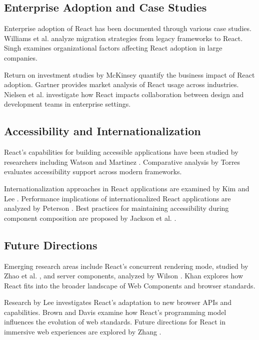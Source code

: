 \subsection{Enterprise Adoption and Case Studies}
Enterprise adoption of React has been documented through various case studies. Williams et al. \cite{williams2022} analyze migration strategies from legacy frameworks to React. Singh \cite{singh2021} examines organizational factors affecting React adoption in large companies.

Return on investment studies by McKinsey \cite{mckinsey2021} quantify the business impact of React adoption. Gartner \cite{gartner2022} provides market analysis of React usage across industries. Nielsen et al. \cite{nielsen2021} investigate how React impacts collaboration between design and development teams in enterprise settings.

\subsection{Accessibility and Internationalization}
React's capabilities for building accessible applications have been studied by researchers including Watson \cite{watson2020} and Martinez \cite{martinez2021}. Comparative analysis by Torres \cite{torres2019} evaluates accessibility support across modern frameworks.

Internationalization approaches in React applications are examined by Kim and Lee \cite{kim2022}. Performance implications of internationalized React applications are analyzed by Peterson \cite{peterson2021}. Best practices for maintaining accessibility during component composition are proposed by Jackson et al. \cite{jackson2022}.

\subsection{Future Directions}
Emerging research areas include React's concurrent rendering mode, studied by Zhao et al. \cite{zhao2022}, and server components, analyzed by Wilson \cite{wilson2022}. Khan \cite{khan2021} explores how React fits into the broader landscape of Web Components and browser standards.

Research by Lee \cite{lee2022} investigates React's adaptation to new browser APIs and capabilities. Brown and Davis \cite{brown2022} examine how React's programming model influences the evolution of web standards. Future directions for React in immersive web experiences are explored by Zhang \cite{zhang2022}.

